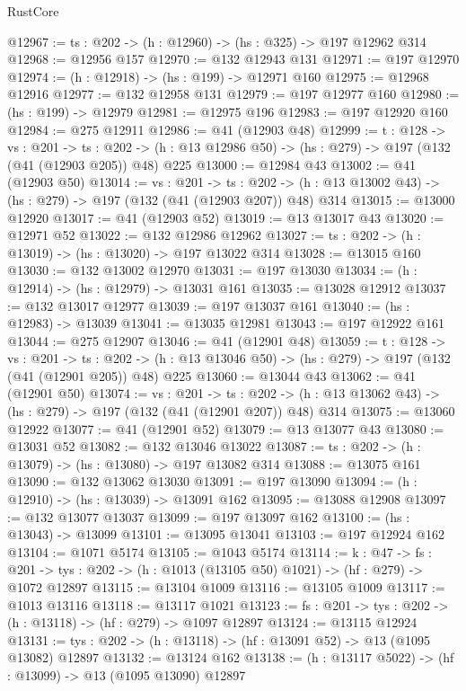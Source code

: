 \begin{lexlean}{RustCore}
\begin{coremodule}
@12967 := {ts : @202} -> (h : @12960) -> (hs : @325) -> @197 @12962 @314
@12968 := @12956 @157
@12970 := @132 @12943 @131
@12971 := @197 @12970
@12974 := (h : @12918) -> (hs : @199) -> @12971 @160
@12975 := @12968 @12916
@12977 := @132 @12958 @131
@12979 := @197 @12977 @160
@12980 := (hs : @199) -> @12979
@12981 := @12975 @196
@12983 := @197 @12920 @160
@12984 := @275 @12911
@12986 := @41 (@12903 @48)
@12999 := {t : @128} ->
  {vs : @201} ->
  {ts : @202} -> (h : @13 @12986 @50) -> (hs : @279) -> @197 (@132 (@41 (@12903 @205)) @48) @225
@13000 := @12984 @43
@13002 := @41 (@12903 @50)
@13014 := {vs : @201} ->
  {ts : @202} -> (h : @13 @13002 @43) -> (hs : @279) -> @197 (@132 (@41 (@12903 @207)) @48) @314
@13015 := @13000 @12920
@13017 := @41 (@12903 @52)
@13019 := @13 @13017 @43
@13020 := @12971 @52
@13022 := @132 @12986 @12962
@13027 := {ts : @202} -> (h : @13019) -> (hs : @13020) -> @197 @13022 @314
@13028 := @13015 @160
@13030 := @132 @13002 @12970
@13031 := @197 @13030
@13034 := (h : @12914) -> (hs : @12979) -> @13031 @161
@13035 := @13028 @12912
@13037 := @132 @13017 @12977
@13039 := @197 @13037 @161
@13040 := (hs : @12983) -> @13039
@13041 := @13035 @12981
@13043 := @197 @12922 @161
@13044 := @275 @12907
@13046 := @41 (@12901 @48)
@13059 := {t : @128} ->
  {vs : @201} ->
  {ts : @202} -> (h : @13 @13046 @50) -> (hs : @279) -> @197 (@132 (@41 (@12901 @205)) @48) @225
@13060 := @13044 @43
@13062 := @41 (@12901 @50)
@13074 := {vs : @201} ->
  {ts : @202} -> (h : @13 @13062 @43) -> (hs : @279) -> @197 (@132 (@41 (@12901 @207)) @48) @314
@13075 := @13060 @12922
@13077 := @41 (@12901 @52)
@13079 := @13 @13077 @43
@13080 := @13031 @52
@13082 := @132 @13046 @13022
@13087 := {ts : @202} -> (h : @13079) -> (hs : @13080) -> @197 @13082 @314
@13088 := @13075 @161
@13090 := @132 @13062 @13030
@13091 := @197 @13090
@13094 := (h : @12910) -> (hs : @13039) -> @13091 @162
@13095 := @13088 @12908
@13097 := @132 @13077 @13037
@13099 := @197 @13097 @162
@13100 := (hs : @13043) -> @13099
@13101 := @13095 @13041
@13103 := @197 @12924 @162
@13104 := @1071 @5174
@13105 := @1043 @5174
@13114 := {k : @47} ->
  {fs : @201} -> {tys : @202} -> (h : @1013 (@13105 @50) @1021) -> (hf : @279) -> @1072 @12897
@13115 := @13104 @1009
@13116 := @13105 @1009
@13117 := @1013 @13116
@13118 := @13117 @1021
@13123 := {fs : @201} -> {tys : @202} -> (h : @13118) -> (hf : @279) -> @1097 @12897
@13124 := @13115 @12924
@13131 := {tys : @202} -> (h : @13118) -> (hf : @13091 @52) -> @13 (@1095 @13082) @12897
@13132 := @13124 @162
@13138 := (h : @13117 @5022) -> (hf : @13099) -> @13 (@1095 @13090) @12897

\end{coremodule}
\end{lexlean}
